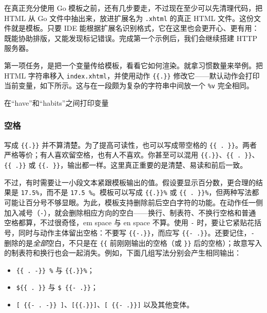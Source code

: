 在真正充分使用 Go 模板之前，还有几步要走，不过现在至少可以先清理代码，把 HTML 从 Go 文件中抽出来，放进扩展名为 \texttt{.xhtml} 的真正 HTML 文件。这份文件就是模板。只要 IDE 能根据扩展名识别格式，它在这里也会更开心、更有用：既能协助排版，又能发现标记错误。完成第一个示例后，我们会继续搭建 HTTP 服务器。

第一项任务，是把一个变量传给模板，看看它如何渲染。就拿习惯数量来举例。把 HTML 字符串移入 \texttt{index.xhtml}，并使用动作 \texttt{\{\{.\}\}} 修改它——默认动作会打印当前变量，如下所示。这与在一段颇为复杂的字符串中间放一个 \texttt{\%v} 完全相同。


\begin{codeannotations}
\item 在“have”和“habits”之间打印变量
\end{codeannotations}

\subsubsection{空格}

写成 \texttt{\{\{.\}\}} 并不算清楚。为了提高可读性，也可以写成带空格的 \texttt{\{\{ . \}\}}。两者严格等价；有人喜欢留空格，也有人不喜欢。你甚至可以混用 \texttt{\{\{.\}\}}、\texttt{\{\{ . \}\}}、\texttt{\{\{ .\}\}} 或 \texttt{\{\{. \}\}}，输出都一样。这里真正重要的是清楚、易读和前后一致。

不过，有时需要让一小段文本紧跟模板输出的值。假设要显示百分数，更合理的结果是 \texttt{17.5\%}，而不是 \texttt{17.5 \%}。模板可以写成 \texttt{\{\{.\}\}\%} 或 \texttt{\{\{ . \}\}\%}，但两种写法都可能让百分号不够显眼。为此，模板支持删除前后空白字符的功能。在动作任一侧加入减号（\texttt{-}），就会删除相应方向的空白——换行、制表符、不换行空格和普通空格都算，不过很奇怪，em space 与 en space 不算。使用 \texttt{-} 时，要让它紧贴花括号，同时与动作主体留出空格：不要写 \texttt{\{\{-.\}\}}，而应写 \texttt{\{\{- .\}\}}。还要记住，\texttt{-} 删除的是\emph{全部}空白，不只是在 \texttt{\{\{} 前刚刚输出的空格（或 \texttt{\}\}} 后的空格）；故意写入的制表符和换行也会一起消失。例如，下面几组写法分别会产生相同输出：

\begin{itemize}
  \item \texttt{\{\{ . -\}\} \%} 与 \texttt{\{\{.\}\}\%}；
  \item \texttt{\$\{\{ . \}\}} 与 \texttt{\$ \{\{- .\}\}}；
  \item \texttt{[ \{\{- . -\}\} ]}、\texttt{[\{\{.\}\}]}、\texttt{[ \{\{- .\}\}]} 以及其他变体。
\end{itemize}

